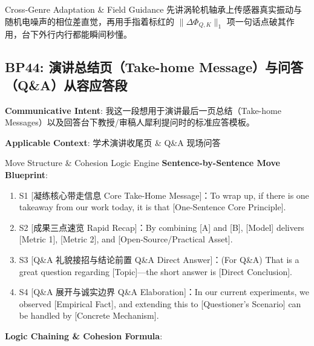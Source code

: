 \endgroup
\vspace{4pt}
\begin{TipBox}{Cross-Genre Adaptation \& Field Guidance}
先讲涡轮机轴承上传感器真实振动与随机电噪声的相位差直觉，再用手指着标红的 $\|\Delta \Phi_{Q,K}\|_1$ 项一句话点破其作用，台下外行内行都能瞬间秒懂。
\end{TipBox}
\vspace{8pt}
\subsection{BP44: 演讲总结页（Take-home Message）与问答（Q\&A）从容应答段}\label{sec:bp:BP44}
\noindent\textbf{\color{AcadNavy}Communicative Intent}: 我这一段想用于演讲最后一页总结（Take-home Messages）以及回答台下教授/审稿人犀利提问时的标准应答模板。\par\vspace{2pt}
\noindent\textbf{\color{AcadSlate}Applicable Context}: 学术演讲收尾页 \& Q\&A 现场问答\par\vspace{4pt}
\begin{ConceptBox}{Move Structure \& Cohesion Logic Engine}
\textbf{Sentence-by-Sentence Move Blueprint}:
\begin{enumerate}[label=\textbf{\color{AcadNavy}S\arabic*.}, leftmargin=2em, itemsep=2pt]
  \item S1 [凝练核心带走信息 Core Take-Home Message]：To wrap up, if there is one takeaway from our work today, it is that [One-Sentence Core Principle].
  \item S2 [成果三点速览 Rapid Recap]：By combining [A] and [B], [Model] delivers [Metric 1], [Metric 2], and [Open-Source/Practical Asset].
  \item S3 [Q\&A 礼貌接招与结论前置 Q\&A Direct Answer]：(For Q\&A) That is a great question regarding [Topic]---the short answer is [Direct Conclusion].
  \item S4 [Q\&A 展开与诚实边界 Q\&A Elaboration]：In our current experiments, we observed [Empirical Fact], and extending this to [Questioner's Scenario] can be handled by [Concrete Mechanism].
\end{enumerate}\par\vspace{4pt}
\textbf{Logic Chaining \& Cohesion Formula}:\par{}
\end{ConceptBox}
